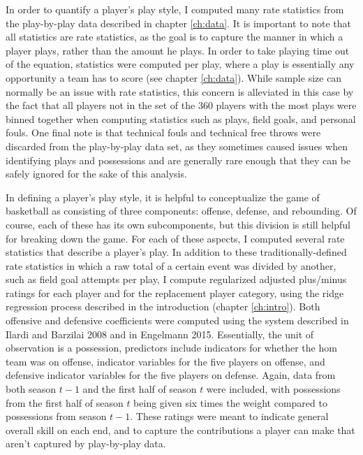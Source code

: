 In order to quantify a player's play style, I computed many rate statistics from the
play-by-play data described in chapter \ref{ch:data}. It is important to note that
all statistics are rate statistics, as the goal is to capture the manner in which a
player plays, rather than the amount he plays. In order to take playing time out of
the equation, statistics were computed per play, where a play is essentially any
opportunity a team has to score (see chapter \ref{ch:data}). While sample size can
normally be an issue with rate statistics, this concern is alleviated in this case
by the fact that all players not in the set of the 360 players with the most plays
were binned together when computing statistics such as plays, field goals, and
personal fouls. One final note is that technical fouls and technical free throws
were discarded from the play-by-play data set, as they sometimes caused issues when
identifying plays and possessions and are generally rare enough that they can be
safely ignored for the sake of this analysis.

In defining a player's play style, it is helpful to conceptualize the game of
basketball as consisting of three components: offense, defense, and rebounding.  Of
course, each of these has its own subcomponents, but this division is still helpful
for breaking down the game. For each of these aspects, I computed several rate
statistics that describe a player's play. In addition to these traditionally-defined
rate statistics in which a raw total of a certain event was divided by another, such
as field goal attempts per play, I compute regularized adjusted plus/minus ratings
for each player and for the replacement player category, using the ridge regression
process described in the introduction (chapter \ref{ch:intro}). Both offensive and
defensive coefficients were computed using the system described in Ilardi and
Barzilai 2008 and in Engelmann 2015. Essentially, the unit of observation is a
possession, predictors include indicators for whether the hom team was on offense,
indicator variables for the five players on offense, and defensive indicator
variables for the five players on defense. Again, data from both season $t-1$ and
the first half of season $t$ were included, with possessions from the first half of
season $t$ being given six times the weight compared to possessions from season
$t-1$. These ratings were meant to indicate general overall skill on each end, and
to capture the contributions a player can make that aren't captured by play-by-play
data.

